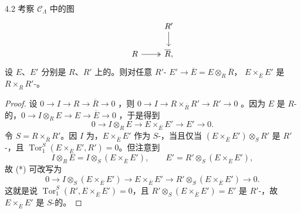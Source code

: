 \begin{SGAresult}{}{4.2}
考察 $\mathcal C_\Lambda$ 中的图
\[
\begin{tikzcd}
&R'\arrow[d]\\
R\arrow[r,two heads]&\overline R,
\end{tikzcd}
\]
设 $E$、$E'$ 分别是 $R$、$R'$ 上的。则对任意 $R'$- $E'\to\overline E=E\otimes_R\overline R$， $E\times_{\overline E}E'$ 是 $R\times_{\overline R}R'$-。
\end{SGAresult}
\begin{proof}
设 $0\to I\to R\to\overline R\to0$ ，则 $0\to I\to R\times_{\overline R}R'\to R'\to0$ 。因为 $E$ 是 $R$-的，$0\to I\otimes_R E\to E\to\overline E\to0$ ，于是得到
\[
0\longrightarrow I\otimes_R E\longrightarrow E\times_{\overline E}E'\longrightarrow E'\longrightarrow0.\tag{*}
\]
令 $S=R\times_{\overline R}R'$。因 $I$ 为，$E\times_{\overline E}E'$ 作为 $S$-，当且仅当 $(E\times_{\overline E}E')\otimes_S R'$ 是 $R'$-，且 $\operatorname{Tor}_1^S(E\times_{\overline E}E',R')=0$。但注意到
\[
I\otimes_R E=I\otimes_S(E\times_{\overline E}E'),\qquad
E'=R'\otimes_S(E\times_{\overline E}E'),
\]
故 (*) 可改写为
\[
0\longrightarrow I\otimes_S(E\times_{\overline E}E')\longrightarrow E\times_{\overline E}E'\longrightarrow R'\otimes_S(E\times_{\overline E}E')\longrightarrow0.
\]
这就是说 $\operatorname{Tor}_1^S(R',E\times_{\overline E}E')=0$，且 $R'\otimes_S(E\times_{\overline E}E')=E'$ 是 $R'$-，故 $E\times_{\overline E}E'$ 是 $S$-的。
\end{proof}

